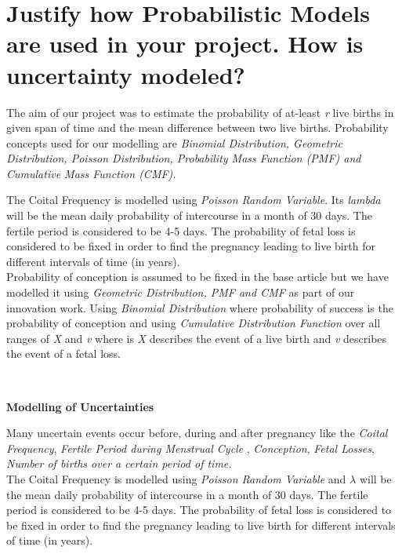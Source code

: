 \documentclass{article}
\begin{document}
\section {Justify how Probabilistic Models are used in your project. How is uncertainty modeled?}
{The aim of our project was to estimate the probability of at-least {\slshape r} live births in given span of time and the mean difference between two live births. Probability concepts used for our modelling are {\slshape Binomial Distribution, Geometric Distribution, Poisson Distribution, Probability Mass Function (PMF) and Cumulative Mass Function (CMF).}\newline

The Coital Frequency is modelled using {\slshape Poisson Random Variable}. Its {\slshape lambda} will be the mean daily probability of intercourse in a month of 30 days. The fertile period is considered to be 4-5 days. The probability of fetal loss is considered to be fixed in order to find the pregnancy leading to live birth for different intervals of time (in years). \\

Probability of conception is assumed to be fixed in the base article but we have modelled it using {\slshape Geometric Distribution, PMF and CMF} as part of our innovation work. Using {\slshape Binomial Distribution} where probability of success is the probability of conception and using {\slshape Cumulative Distribution Function} over all ranges of {\slshape X} and {\slshape v} where is {\slshape X} describes the event of a live birth and {\slshape v} describes the event of a fetal loss.}\\
\begin{center}
	{\large {\bfseries Modelling of Uncertainties}}
\end{center}
Many uncertain events occur before, during and after pregnancy like the {\slshape Coital Frequency}, {\slshape Fertile Period during Menstrual Cycle} , {\slshape Conception}, {\slshape Fetal Losses}, {\slshape Number of births over a certain period of time.}\\

The Coital Frequency is modelled using {\slshape Poisson Random Variable} and {\slshape $\lambda$} will be the mean daily probability of intercourse in a month of 30 days. The fertile period is considered to be 4-5 days. The probability of fetal loss is considered to be fixed in order to find the pregnancy leading to live birth for different intervals of time (in years).\\
\end{document}
